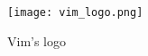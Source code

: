 \begin{frame}[fragile]
  \frametitle{\vimwebsite}
  \begin{figure}
    \centering
    \texttt{[image: vim\_logo.png]}
    \caption{Vim's logo}
    \label{fig:vim-logo}
  \end{figure}
\end{frame}

